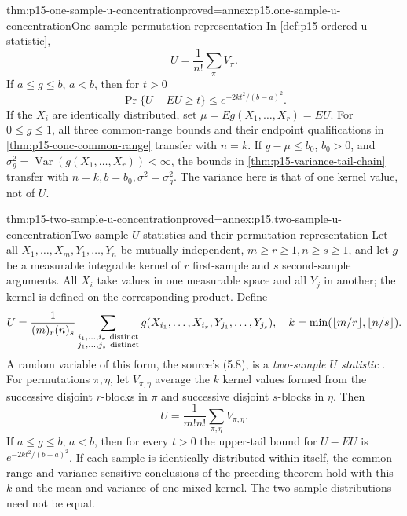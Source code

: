 \begin{hbtheorem}{thm:p15-one-sample-u-concentration}{proved=annex:p15.one-sample-u-concentration}{One-sample permutation representation}
In \cref{def:p15-ordered-u-statistic},
\[
 U=\frac1{n!}\sum_\pi V_\pi.
\]
If \(a\leq g\leq b\), \(a<b\), then for \(t>0\)
\[
 \Pr\{U-EU\geq t\}\leq e^{-2kt^2/(b-a)^2}.
\]
If the \(X_i\) are identically distributed, set
\(\mu=Eg(X_1,\ldots,X_r)=EU\).
For \(0\leq g\leq1\), all three common-range bounds and their endpoint
qualifications in \cref{thm:p15-conc-common-range} transfer with \(n=k\).
If \(g-\mu\leq b_0\), \(b_0>0\), and
\(\sigma_g^2=\operatorname{Var}(g(X_1,\ldots,X_r))<\infty\), the bounds
in \cref{thm:p15-variance-tail-chain} transfer with
\(n=k,b=b_0,\sigma^2=\sigma_g^2\).
The variance here is that of one kernel value, not of \(U\).
\end{hbtheorem}

\begin{hbtheorem}{thm:p15-two-sample-u-concentration}{proved=annex:p15.two-sample-u-concentration}{Two-sample \(U\) statistics and their permutation representation}
Let all \(X_1,\ldots,X_m,Y_1,\ldots,Y_n\) be mutually independent,
\(m\geq r\geq1,n\geq s\geq1\), and let \(g\) be a measurable integrable
kernel of \(r\) first-sample and \(s\) second-sample arguments.
All \(X_i\) take values in one measurable space and all \(Y_j\) in
another; the kernel is defined on the corresponding product. Define
\[
 U=\frac1{(m)_r(n)_s}
 \sum_{\substack{i_1,\ldots,i_r\ {\rm distinct}\\
                 j_1,\ldots,j_s\ {\rm distinct}}}
 g(X_{i_1},\ldots,X_{i_r},Y_{j_1},\ldots,Y_{j_s}),\quad
 k=\min(\lfloor m/r\rfloor,\lfloor n/s\rfloor).
\]
A random variable of this form, the source's (5.8), is a
\emph{two-sample \(U\) statistic} \cite[pp.~25--26]{Hoeffding1963BoundedSums}.
For permutations \(\pi,\eta\), let \(V_{\pi,\eta}\) average the \(k\)
kernel values formed from the successive disjoint \(r\)-blocks in
\(\pi\) and successive disjoint \(s\)-blocks in \(\eta\). Then
\[
 U=\frac1{m!n!}\sum_{\pi,\eta}V_{\pi,\eta}.
\]
If \(a\leq g\leq b\), \(a<b\), then for every \(t>0\) the upper-tail
bound for \(U-EU\) is \(e^{-2kt^2/(b-a)^2}\).
If each sample is identically distributed within itself, the common-range
and variance-sensitive conclusions of the preceding theorem hold with
this \(k\) and the mean and variance of one mixed kernel.
The two sample distributions need not be equal.
\end{hbtheorem}

